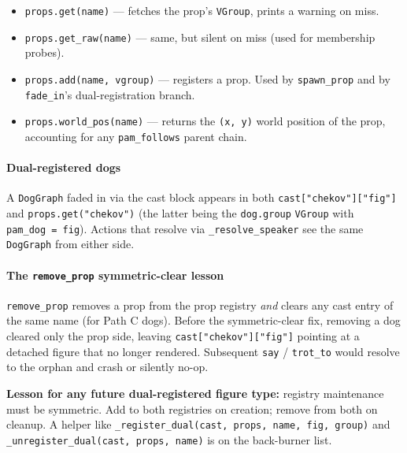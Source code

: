\documentclass[
  12pt,
  letterpaper,
]{book}
\providecommand{\tightlist}{%
  \setlength{\itemsep}{0pt}\setlength{\parskip}{0pt}}
\begin{document}
\begin{itemize}
\tightlist
\item
  \texttt{props.get(name)} --- fetches the prop's \texttt{VGroup},
  prints a warning on miss.
\item
  \texttt{props.get\_raw(name)} --- same, but silent on miss (used for
  membership probes).
\item
  \texttt{props.add(name,\ vgroup)} --- registers a prop. Used by
  \texttt{spawn\_prop} and by \texttt{fade\_in}'s dual-registration
  branch.
\item
  \texttt{props.world\_pos(name)} --- returns the \texttt{(x,\ y)} world
  position of the prop, accounting for any \texttt{pam\_follows} parent
  chain.
\end{itemize}

\paragraph{Dual-registered dogs}\label{dual-registered-dogs}

A \texttt{DogGraph} faded in via the cast block appears in both
\texttt{cast{[}"chekov"{]}{[}"fig"{]}} and \texttt{props.get("chekov")}
(the latter being the \texttt{dog.group} \texttt{VGroup} with
\texttt{pam\_dog\ =\ fig}). Actions that resolve via
\texttt{\_resolve\_speaker} see the same \texttt{DogGraph} from either
side.

\paragraph{\texorpdfstring{The \texttt{remove\_prop} symmetric-clear
lesson}{The remove\_prop symmetric-clear lesson}}\label{the-remove_prop-symmetric-clear-lesson}

\texttt{remove\_prop} removes a prop from the prop registry \emph{and}
clears any cast entry of the same name (for Path C dogs). Before the
symmetric-clear fix, removing a dog cleared only the prop side, leaving
\texttt{cast{[}"chekov"{]}{[}"fig"{]}} pointing at a detached figure
that no longer rendered. Subsequent \texttt{say} / \texttt{trot\_to}
would resolve to the orphan and crash or silently no-op.

\textbf{Lesson for any future dual-registered figure type:} registry
maintenance must be symmetric. Add to both registries on creation;
remove from both on cleanup. A helper like
\texttt{\_register\_dual(cast,\ props,\ name,\ fig,\ group)} and
\texttt{\_unregister\_dual(cast,\ props,\ name)} is on the back-burner
list.
\end{document}
